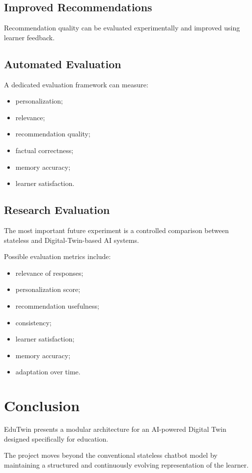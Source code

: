 \documentclass[12pt,a4paper]{article}
\begin{document}
\subsection{Improved Recommendations}
Recommendation quality can be evaluated experimentally and improved using learner feedback.

\subsection{Automated Evaluation}
A dedicated evaluation framework can measure:
\begin{itemize}[noitemsep,topsep=2pt]
    \item personalization;
    \item relevance;
    \item recommendation quality;
    \item factual correctness;
    \item memory accuracy;
    \item learner satisfaction.
\end{itemize}

\subsection{Research Evaluation}
The most important future experiment is a controlled comparison between stateless and Digital-Twin-based AI systems.

Possible evaluation metrics include:
\begin{itemize}[noitemsep,topsep=2pt]
    \item relevance of responses;
    \item personalization score;
    \item recommendation usefulness;
    \item consistency;
    \item learner satisfaction;
    \item memory accuracy;
    \item adaptation over time.
\end{itemize}

\section{Conclusion}
EduTwin presents a modular architecture for an AI-powered Digital Twin designed specifically for education.

The project moves beyond the conventional stateless chatbot model by maintaining a structured and continuously evolving representation of the learner.
\end{document}
